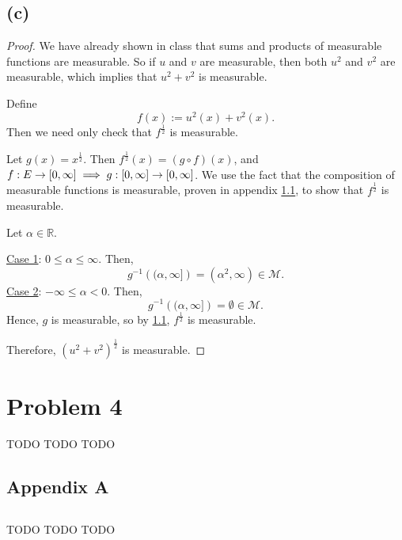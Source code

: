 \documentclass{article}
\newcommand{\R}{\mathbb{R}} %
\newcommand{\M}{\mathcal{M}} %
\begin{document}
\subsection*{(c)}
\begin{proof}
	We have already shown in class that sums and products of measurable functions are measurable. So if $u$ and $v$ are measurable, then both $u^2$ and $v^2$ are measurable, which implies that $u^2 + v^2$ is measurable.
	
	Define
	\begin{equation}
		f(x) := u^2(x) + v^2(x).
	\end{equation}
	Then we need only check that $f^{\frac{1}{2}}$ is measurable.
	
	Let $g(x) = x^{\frac{1}{2}}$. Then $f^{\frac{1}{2}}(x) = (g \circ f)(x)$, and $f: E \rightarrow [0,\infty] \\ \implies g: [0, \infty] \rightarrow [0, \infty]$. We use the fact that the composition of measurable functions is measurable, proven in appendix \ref{appendix:A.1}, to show that $f^{\frac{1}{2}}$ is measurable. 
	
	Let $\alpha \in \R$.
	
	\underline{Case 1}: $0 \leq \alpha \leq \infty$. Then,
	\begin{equation}
		g^{-1}\left((\alpha, \infty]\right) = (\alpha^2, \infty) \in \M.
	\end{equation}
	\underline{Case 2}: $-\infty \leq \alpha < 0$. Then,
	\begin{equation}
		g^{-1}\left((\alpha, \infty]\right) = \emptyset \in \M.
	\end{equation}
	Hence, $g$ is measurable, so by \ref{appendix:A.1}, $f^{\frac{1}{2}}$ is measurable.
	
	Therefore, $(u^2 + v^2)^{\frac{1}{2}}$ is measurable.
\end{proof}
\section*{Problem 4}
TODO TODO TODO

\begin{appendices}
	
\section{Appendix A}
\subsection{}
\label{appendix:A.1}
TODO TODO TODO

\end{appendices}
\end{document}
